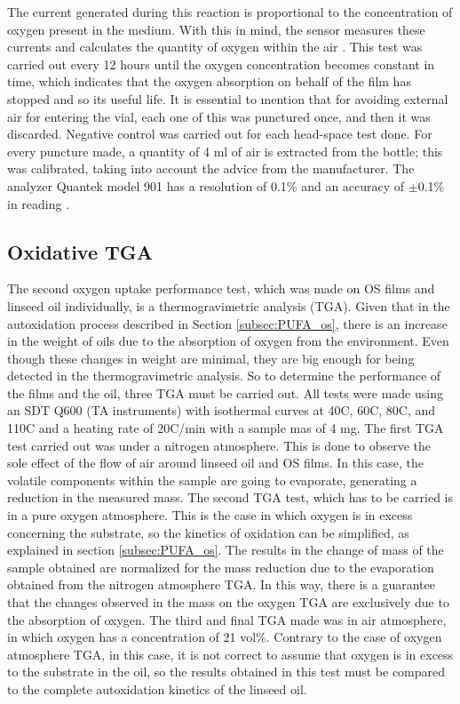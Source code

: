 \begin{refsection}
 
 The current generated during this reaction is proportional to the concentration of oxygen present in the medium. With this in mind,  the sensor measures these currents and calculates the quantity of oxygen within the air \cite{GarciaMora2015KineticScavengers, Boissevain1996CorporateGuide}. This test was carried out every 12 hours until the oxygen concentration becomes constant in time, which indicates that the oxygen absorption on behalf of the film has stopped and so its useful life. It is essential to mention that for avoiding external air for entering the vial, each one of this was punctured once, and then it was discarded. Negative control was carried out for each head-space test done. For every puncture made, a  quantity of 4 ml of air is extracted from the bottle; this was calibrated, taking into account the advice from the manufacturer. The analyzer Quantek model 901 has a resolution of 0.1\% and an accuracy of $\pm$0.1\% in reading \cite{Instruments2019ModelAnalyzer}. 
 
\subsection{Oxidative TGA}
The second oxygen uptake performance test, which was made on OS films and linseed oil individually, is a thermogravimetric analysis (TGA). Given that in the autoxidation process described in Section \ref{subsec:PUFA_os}, there is an increase in the weight of oils due to the absorption of oxygen from the environment. Even though these changes in weight are minimal, they are big enough for being detected in the thermogravimetric analysis. So to determine the performance of the films and the oil, three TGA must be carried out. All tests were made using an SDT Q600 (TA instruments) with isothermal curves at 40\degree C, 60\degree C, 80\degree C, and 110\degree C and a heating rate of 20\degree C/min with a sample mas of 4 mg. The first TGA test carried out was under a nitrogen atmosphere. This is done to observe the sole effect of the flow of air around linseed oil and OS films. In this case, the volatile components within the sample are going to evaporate, generating a reduction in the measured mass. The second TGA test, which has to be carried is in a pure oxygen atmosphere. This is the case in which oxygen is in excess concerning the substrate, so the kinetics of oxidation can be simplified, as explained in section \ref{subsec:PUFA_os}. The results in the change of mass of the sample obtained are normalized for the mass reduction due to the evaporation obtained from the nitrogen atmosphere TGA. In this way, there is a guarantee that the changes observed in the mass on the oxygen TGA are exclusively due to the absorption of oxygen. The third and final TGA made was in air atmosphere, in which oxygen has a concentration of 21 vol\%. Contrary to the case of oxygen atmosphere TGA, in this case, it is not correct to assume that oxygen is in excess to the substrate in the oil, so the results obtained in this test must be compared to the complete autoxidation kinetics of the linseed oil.   


\end{refsection}
